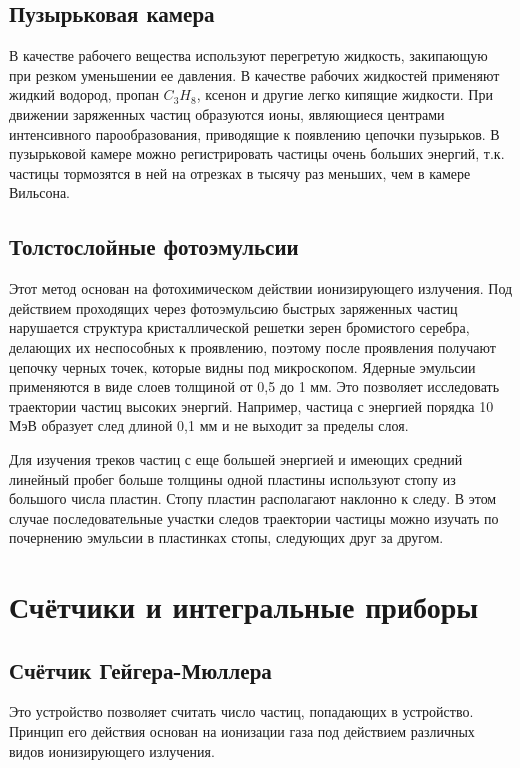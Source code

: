 \documentclass[14pt,pscyr,titlepage]{hedreport}
\begin{document}
	\subsection{Пузырьковая камера}
		В качестве  рабочего вещества используют перегретую жидкость, 
		закипающую при резком уменьшении ее давления. В качестве рабочих 
		жидкостей применяют жидкий водород, пропан \( C_3 H_8 \), ксенон и 
		другие легко кипящие жидкости. При движении заряженных частиц 
		образуются ионы, являющиеся центрами интенсивного парообразования, 
		приводящие к появлению цепочки пузырьков. В пузырьковой камере можно 
		регистрировать частицы очень больших энергий, т.к. частицы тормозятся 
		в ней на отрезках в тысячу раз меньших, чем в камере Вильсона. 

	\subsection{Толстослойные фотоэмульсии}
		Этот метод основан на фотохимическом действии ионизирующего излучения. 
		Под действием проходящих через фотоэмульсию быстрых заряженных частиц 
		нарушается структура кристаллической решетки зерен бромистого серебра, 
		делающих их неспособных к проявлению, поэтому после проявления 
		получают цепочку черных точек, которые видны под микроскопом. Ядерные 
		эмульсии применяются в виде слоев толщиной от 0,5 до 1 мм. Это 
		позволяет исследовать траектории частиц высоких энергий. Например, 
		частица с энергией порядка 10 МэВ образует след длиной 0,1 мм и не 
		выходит за пределы слоя. 

    	Для изучения треков частиц с еще большей энергией и имеющих средний 
    	линейный пробег больше толщины одной пластины используют стопу из 
    	большого числа пластин.  Стопу пластин располагают наклонно к следу. 
    	В этом случае последовательные участки следов траектории частицы можно 
    	изучать по почернению эмульсии в пластинках стопы, следующих друг 
    	за другом. 

	\section{Счётчики и интегральные приборы}
	\subsection{Счётчик Гейгера-Мюллера}
		Это устройство позволяет считать число частиц, попадающих в 
		устройство. Принцип его действия основан на ионизации газа под 
		действием различных видов ионизирующего излучения.
\end{document}
